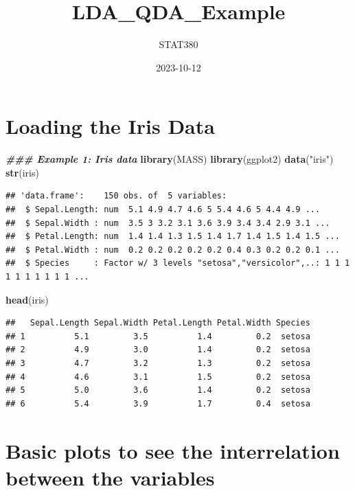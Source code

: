 \documentclass[
]{article}
\title{LDA\_QDA\_Example}
\author{STAT380}
\date{2023-10-12}
\newenvironment{Shaded}{\begin{snugshade}}{\end{snugshade}}
\newcommand{\DocumentationTok}[1]{\textcolor[rgb]{0.56,0.35,0.01}{\textbf{\textit{#1}}}}
\newcommand{\FunctionTok}[1]{\textcolor[rgb]{0.13,0.29,0.53}{\textbf{#1}}}
\newcommand{\NormalTok}[1]{#1}
\newcommand{\StringTok}[1]{\textcolor[rgb]{0.31,0.60,0.02}{#1}}
\begin{document}
\maketitle

\hypertarget{loading-the-iris-data}{%
\section{Loading the Iris Data}\label{loading-the-iris-data}}

\begin{Shaded}
\begin{Highlighting}[]
\DocumentationTok{\#\#\# Example 1: Iris data}
\FunctionTok{library}\NormalTok{(MASS)}
\FunctionTok{library}\NormalTok{(ggplot2)}
\FunctionTok{data}\NormalTok{(}\StringTok{"iris"}\NormalTok{)}
\FunctionTok{str}\NormalTok{(iris)}
\end{Highlighting}
\end{Shaded}

\begin{verbatim}
## 'data.frame':    150 obs. of  5 variables:
##  $ Sepal.Length: num  5.1 4.9 4.7 4.6 5 5.4 4.6 5 4.4 4.9 ...
##  $ Sepal.Width : num  3.5 3 3.2 3.1 3.6 3.9 3.4 3.4 2.9 3.1 ...
##  $ Petal.Length: num  1.4 1.4 1.3 1.5 1.4 1.7 1.4 1.5 1.4 1.5 ...
##  $ Petal.Width : num  0.2 0.2 0.2 0.2 0.2 0.4 0.3 0.2 0.2 0.1 ...
##  $ Species     : Factor w/ 3 levels "setosa","versicolor",..: 1 1 1 1 1 1 1 1 1 1 ...
\end{verbatim}

\begin{Shaded}
\begin{Highlighting}[]
\FunctionTok{head}\NormalTok{(iris)}
\end{Highlighting}
\end{Shaded}

\begin{verbatim}
##   Sepal.Length Sepal.Width Petal.Length Petal.Width Species
## 1          5.1         3.5          1.4         0.2  setosa
## 2          4.9         3.0          1.4         0.2  setosa
## 3          4.7         3.2          1.3         0.2  setosa
## 4          4.6         3.1          1.5         0.2  setosa
## 5          5.0         3.6          1.4         0.2  setosa
## 6          5.4         3.9          1.7         0.4  setosa
\end{verbatim}

\hypertarget{basic-plots-to-see-the-interrelation-between-the-variables}{%
\section{Basic plots to see the interrelation between the
variables}\label{basic-plots-to-see-the-interrelation-between-the-variables}}
\end{document}

